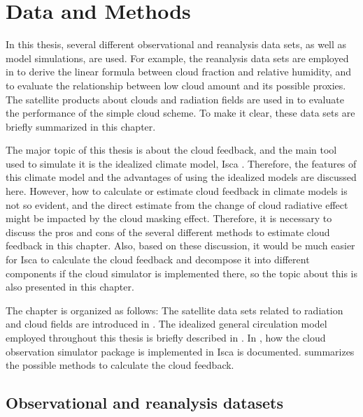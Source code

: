 \chapter{Data and Methods}
\label{ch:methods}

In this thesis, several different observational and reanalysis data sets, as well as model simulations, are used. For example, the reanalysis data sets are employed in  to derive the linear formula between cloud fraction and relative humidity, and to evaluate the relationship between low cloud amount and its possible proxies. The satellite products about clouds and radiation fields are used in  to evaluate the performance of the simple cloud scheme. To make it clear, these data sets are briefly summarized in this chapter.

The major topic of this thesis is about the cloud feedback, and the main tool used to simulate it is the idealized climate model, Isca \citep{Vallis2018}. Therefore, the features of this climate model and the advantages of using the idealized models are discussed here. However, how to calculate or estimate cloud feedback in climate models is not so evident, and the direct estimate from the change of cloud radiative effect might be impacted by the cloud masking effect. Therefore, it is necessary to discuss the pros and cons of the several different methods to estimate cloud feedback in this chapter. Also, based on these discussion, it would be much easier for Isca to calculate the cloud feedback and decompose it into different components if the cloud simulator is implemented there, so the topic about this is also presented in this chapter. 

The chapter is organized as follows: The satellite data sets related to radiation and cloud fields are introduced in . The idealized general circulation model employed throughout this thesis is briefly described in . In , how the cloud observation simulator package is implemented in Isca is documented.  summarizes the possible methods to calculate the cloud feedback.

\section{Observational and reanalysis datasets}
\label{sec:obs_reanalysis_dataset}

